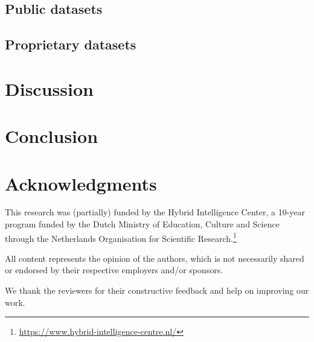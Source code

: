 \documentclass[preprint, 3p, times, twocolumn]{elsarticle}
\begin{document}
  \subsection{Public datasets}
    \label{subsec:publicdatasets}

  \subsection{Proprietary datasets}
    \label{subsec:proprietarydatasets}

\section{Discussion}
  \label{sec:discussion}


\section{Conclusion}
  \label{sec:conclusion}

\section*{Acknowledgments}
  This research was (partially) funded by the Hybrid Intelligence Center, a 10-year program funded by the Dutch Ministry of Education, Culture and Science through the Netherlands Organisation for Scientific Research.\footnote{\url{https://www.hybrid-intelligence-centre.nl/}}

  All content represents the opinion of the authors, which is not necessarily shared or endorsed by their respective employers and/or sponsors.
  
  We thank the reviewers for their constructive feedback and help on improving our work. 

\clearpage

\appendix

 

\end{document}
